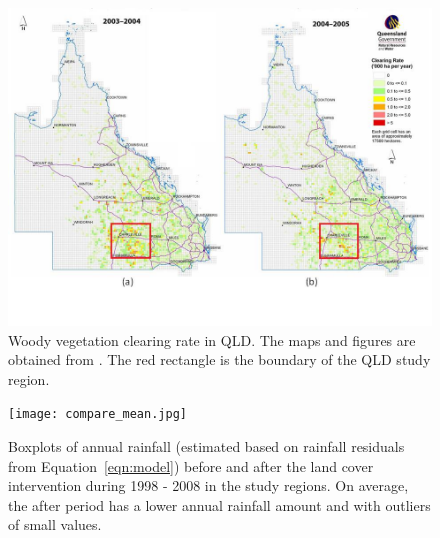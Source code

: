 \documentclass[draft,linenumbers]{agujournal}
\begin{document}
\begin{article}
\begin{figure}[htp]
  \centering
  \includegraphics[scale=0.6]{slat.jpg}
  \caption{Woody vegetation clearing rate in QLD. The maps and figures are obtained from \citet{SLATS2004}. The red rectangle is the boundary of the QLD study region.}
  \label{fig:slat}
\end{figure}

\begin{figure}[htp]
  \centering
  \texttt{[image: compare\_mean.jpg]}
  \caption[Boxplots of annual rainfall (estimated based on rainfall residuals from Equation~\ref{eqn:model}) before and after the land cover intervention during 1998 - 2008 in the study regions.]{Boxplots of annual rainfall (estimated based on rainfall residuals from Equation~\ref{eqn:model}) before and after the land cover intervention during 1998 - 2008 in the study regions. On average, the after period has a lower annual rainfall amount and with outliers of small values.}
  \label{fig:mean_diff}
\end{figure}


\end{article}
\end{document}
